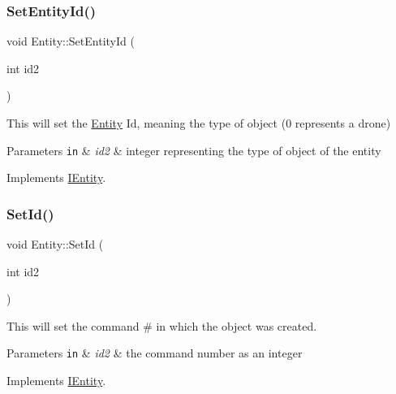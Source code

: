 \subsubsection{\texorpdfstring{Set\+Entity\+Id()}{SetEntityId()}}
{\footnotesize\ttfamily void Entity\+::\+Set\+Entity\+Id (\begin{DoxyParamCaption}\item[{int}]{id2 }\end{DoxyParamCaption})\hspace{0.3cm}{\ttfamily [virtual]}}



This will set the \hyperlink{classEntity}{Entity} Id, meaning the type of object (0 represents a drone) 


\begin{DoxyParams}[1]{Parameters}
\mbox{\tt in}  & {\em id2} & integer representing the type of object of the entity \\
\hline
\end{DoxyParams}


Implements \hyperlink{classIEntity_a3a830862181cb0548d2aca83d908263e}{I\+Entity}.

\mbox{\label{classEntity_ac806fc870b7d2419fbd207cf6ca4dd2e}} 
\subsubsection{\texorpdfstring{Set\+Id()}{SetId()}}
{\footnotesize\ttfamily void Entity\+::\+Set\+Id (\begin{DoxyParamCaption}\item[{int}]{id2 }\end{DoxyParamCaption})\hspace{0.3cm}{\ttfamily [virtual]}}



This will set the command \# in which the object was created. 


\begin{DoxyParams}[1]{Parameters}
\mbox{\tt in}  & {\em id2} & the command number as an integer \\
\hline
\end{DoxyParams}


Implements \hyperlink{classIEntity_a8c6af682e07f569ba2f164d214295c67}{I\+Entity}.

\mbox{\label{classEntity_acf8bd6d266b147e86248c1ce5d925665}} 
